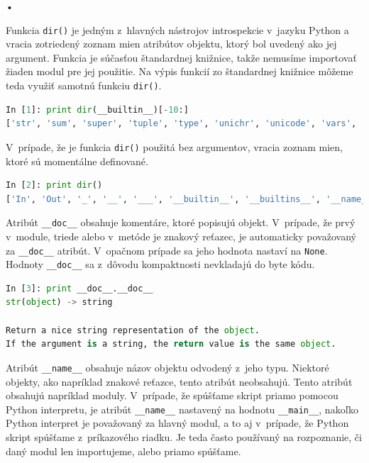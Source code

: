 \documentclass[11pt,oneside,final]{fithesis2}
\begin{document}
\begin{list}{•}{}
		\item 
			Funkcia \texttt{dir()} je jedným z~hlavných nástrojov introspekcie v~jazyku Python a vracia zotriedený zoznam mien atribútov objektu, ktorý bol uvedený ako jej argument. Funkcia je súčasťou štandardnej knižnice, takže nemusíme importovať žiaden modul pre jej použitie. Na výpis funkcií zo štandardnej knižnice môžeme teda využiť samotnú funkciu \texttt{dir()}.
			

\begin{lstlisting}[language=python]
In [1]: print dir(__builtin__)[-10:]
['str', 'sum', 'super', 'tuple', 'type', 'unichr', 'unicode', 'vars', 'xrange', 'zip']
\end{lstlisting}

			 V~prípade, že je funkcia \texttt{dir()} použitá bez argumentov, vracia zoznam mien, ktoré sú momentálne definované.

\begin{lstlisting}[language=python]
In [2]: print dir()
['In', 'Out', '_', '__', '___', '__builtin__', '__builtins__', '__name__', '_dh', '_i', '_i1', '_i2', '_ih', '_ii', '_iii', '_oh', '_sh', 'exit', 'get_ipython', 'help', 'quit']

\end{lstlisting}
	

		\item 
			Atribút \texttt{\_\_doc\_\_} obsahuje komentáre, ktoré popisujú objekt. V~prípade, že prvý v~module, triede alebo v~metóde je znakový reťazec, je automaticky považovaný za \texttt{\_\_doc\_\_} atribút. V~opačnom prípade sa jeho hodnota nastaví na \texttt{None}. Hodnoty \texttt{\_\_doc\_\_} sa z~dôvodu kompaktnosti nevkladajú do byte kódu.
			
\begin{lstlisting}[language=python]
In [3]: print __doc__.__doc__
str(object) -> string

Return a nice string representation of the object.
If the argument is a string, the return value is the same object.
\end{lstlisting}

		\item 
			Atribút \texttt{\_\_name\_\_} obsahuje názov objektu odvodený z~jeho typu. Niektoré objekty, ako napríklad znakové reťazce, tento atribút neobsahujú. Tento atribút obsahujú napríklad moduly. V~prípade, že spúšťame skript priamo pomocou Python interpretu, je atribút \texttt{\_\_name\_\_} nastavený na hodnotu \texttt{\_\_main\_\_}, nakoľko Python interpret je považovaný za hlavný modul, a to aj v~prípade, že Python skript spúšťame z~príkazového riadku. Je teda často používaný na rozpoznanie, či daný modul len importujeme, alebo priamo spúšťame.
	

\end{list}
\end{document}
